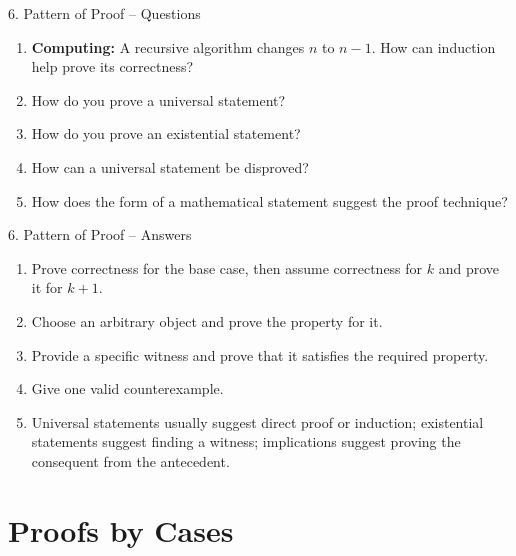 \documentclass[aspectratio=169,11pt]{beamer}
\begin{document}
\begin{frame}{6. Pattern of Proof -- Questions}

\begin{enumerate}
\item \textbf{Computing:} A recursive algorithm changes $n$ to $n-1$. How can induction help prove its correctness?

\item How do you prove a universal statement?

\item How do you prove an existential statement?

\item How can a universal statement be disproved?

\item How does the form of a mathematical statement suggest the proof technique?
\end{enumerate}

\end{frame}

\begin{frame}{6. Pattern of Proof -- Answers}

\begin{enumerate}
\item Prove correctness for the base case, then assume correctness for $k$ and prove it for $k+1$.

\item Choose an arbitrary object and prove the property for it.

\item Provide a specific witness and prove that it satisfies the required property.

\item Give one valid counterexample.

\item Universal statements usually suggest direct proof or induction; existential statements suggest finding a witness; implications suggest proving the consequent from the antecedent.
\end{enumerate}

\end{frame}


\section{Proofs by Cases}
\end{document}
